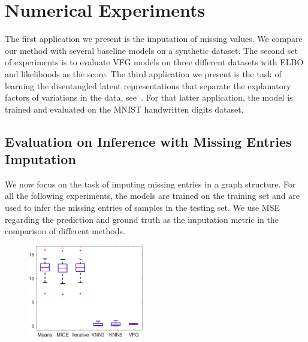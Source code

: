 \documentclass{article}
\begin{document}
\vspace{-0.1in}
\section{Numerical Experiments}\label{sec:numerical}
The first  application we present is the imputation of missing values. We compare our method with several baseline models  on a synthetic dataset.
The second set of experiments is to evaluate VFG models on three different datasets with ELBO and likelihoods as the score.  
The third application we present is the task of learning the disentangled latent representations that separate the explanatory factors of variations in the data, see~\cite{bengio2013representation}.
For that latter application, the model is trained and evaluated on the MNIST handwritten digits dataset.
\subsection{Evaluation on Inference with Missing Entries Imputation}%
We now focus on the task of imputing missing entries in a graph structure.
For all the following experiments, the models are trained on the training set and are used to infer the missing entries of samples in the testing set. We use MSE  regarding the prediction and ground truth as the imputation metric in the comparison of different methods. 
\begin{figure}
       \includegraphics[width=0.45\textwidth]{fig/sim_box_t.eps}
    \label{fig:sim}
\end{figure}
\end{document}
